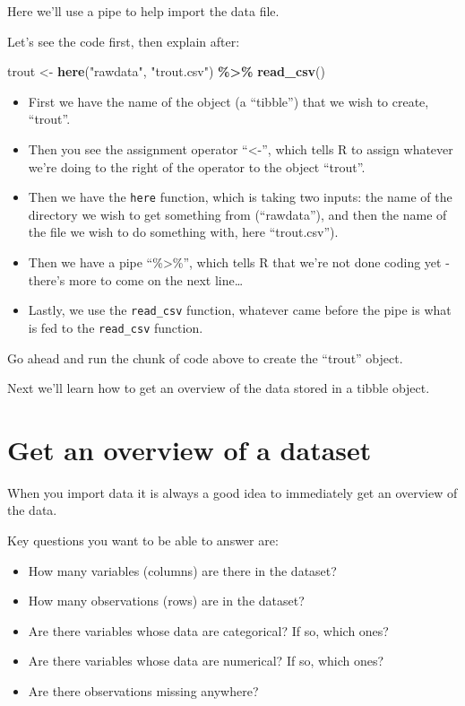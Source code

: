 \documentclass[
]{book}
\newenvironment{Shaded}{\begin{snugshade}}{\end{snugshade}}
\newcommand{\FunctionTok}[1]{\textcolor[rgb]{0.13,0.29,0.53}{\textbf{#1}}}
\newcommand{\NormalTok}[1]{#1}
\newcommand{\OtherTok}[1]{\textcolor[rgb]{0.56,0.35,0.01}{#1}}
\newcommand{\SpecialCharTok}[1]{\textcolor[rgb]{0.81,0.36,0.00}{\textbf{#1}}}
\newcommand{\StringTok}[1]{\textcolor[rgb]{0.31,0.60,0.02}{#1}}
\providecommand{\tightlist}{%
  \setlength{\itemsep}{0pt}\setlength{\parskip}{0pt}}
\begin{document}
Here we'll use a pipe to help import the data file.

Let's see the code first, then explain after:

\begin{Shaded}
\begin{Highlighting}[]
\NormalTok{trout }\OtherTok{\textless{}{-}} \FunctionTok{here}\NormalTok{(}\StringTok{"rawdata"}\NormalTok{, }\StringTok{"trout.csv"}\NormalTok{) }\SpecialCharTok{\%\textgreater{}\%}
  \FunctionTok{read\_csv}\NormalTok{()}
\end{Highlighting}
\end{Shaded}

\begin{itemize}
\tightlist
\item
  First we have the name of the object (a ``tibble'') that we wish to create, ``trout''.
\item
  Then you see the assignment operator ``\textless-'', which tells R to assign whatever we're doing to the right of the operator to the object ``trout''.
\item
  Then we have the \texttt{here} function, which is taking two inputs: the name of the directory we wish to get something from (``rawdata''), and then the name of the file we wish to do something with, here ``trout.csv'').
\item
  Then we have a pipe ``\%\textgreater\%'', which tells R that we're not done coding yet - there's more to come on the next line\ldots{}
\item
  Lastly, we use the \texttt{read\_csv} function, whatever came before the pipe is what is fed to the \texttt{read\_csv} function.
\end{itemize}

Go ahead and run the chunk of code above to create the ``trout'' object.

Next we'll learn how to get an overview of the data stored in a tibble object.

\section{Get an overview of a dataset}\label{data_overview}

When you import data it is always a good idea to immediately get an overview of the data.

Key questions you want to be able to answer are:

\begin{itemize}
\tightlist
\item
  How many variables (columns) are there in the dataset?
\item
  How many observations (rows) are in the dataset?\\
\item
  Are there variables whose data are categorical? If so, which ones?
\item
  Are there variables whose data are numerical? If so, which ones?
\item
  Are there observations missing anywhere?
\end{itemize}
\end{document}
